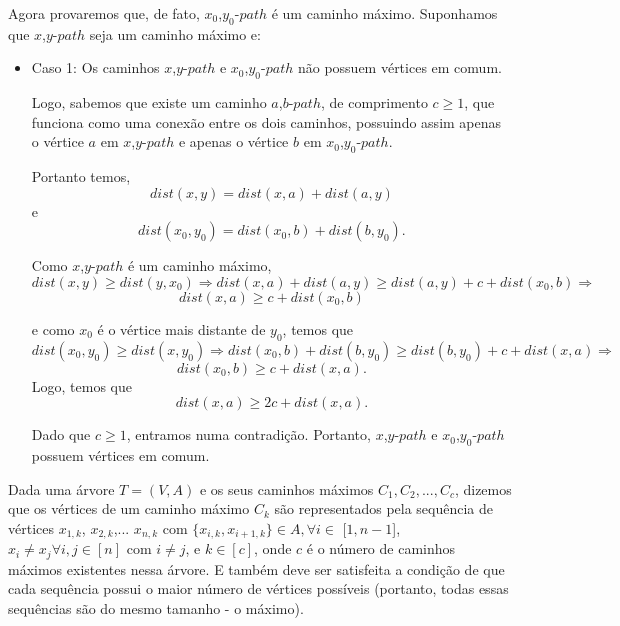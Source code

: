 \documentclass[a4paper,12pt]{article}
\begin{document}
    	Agora provaremos que, de fato, $x_0$,$y_0$-$path$ é um
    	caminho máximo.
    	Suponhamos que $x$,$y$-$path$ seja um caminho máximo e:

    	\begin{itemize}
            \item Caso 1: Os caminhos $x$,$y$-$path$ e 
            $x_0$,$y_0$-$path$ não possuem vértices em comum.
         


            Logo, sabemos que existe um caminho $a$,$b$-$path$, 
            de comprimento $c \ge 1$,
            que funciona como uma conexão entre os dois caminhos,
            possuindo assim apenas o vértice $a$ em 
            $x$,$y$-$path$ e apenas o vértice $b$ em
            $x_0$,$y_0$-$path$.

            Portanto temos,
            $$ dist(x,y) = dist(x,a) + dist(a,y) $$ e
            $$ dist(x_0,y_0) = dist(x_0,b) + dist(b,y_0).$$

            Como $x$,$y$-$path$ é um caminho máximo,
            $$ dist(x,y)\ge dist(y,x_0) \Rightarrow 
            dist(x,a)+dist(a,y)\ge dist(a,y)+c+dist(x_0,b)
            \Rightarrow$$
            $$ dist(x,a)\ge c+dist(x_0,b) $$

            e como $x_0$ é o vértice mais distante de $y_0$, temos
            que 
            $$ dist(x_0,y_0)\ge dist(x,y_0) \Rightarrow 
            dist(x_0,b) + dist(b,y_0)\ge dist(b,y_0) + c + 
            dist(x,a) \Rightarrow $$
            $$ dist(x_0,b)\ge c + dist(x,a). $$ 
            Logo, temos que
            $$ dist(x,a)\ge 2c + dist(x, a). $$

            Dado que $c\ge 1$, entramos numa contradição. 
            Portanto, $x$,$y$-$path$ e $x_0$,$y_0$-$path$
            possuem vértices em comum.

        \end{itemize}




    	\newpage



        Dada uma árvore $T = (V,A)$ e os seus caminhos máximos 
        $C_1, C_2,..., C_c$, dizemos que os vértices de um caminho
        máximo $C_k$ são representados pela sequência de vértices 
        $x_{1, k}$, $x_{2, k}$,... $x_{n, k}$ com 
        $\{x_{i, k}, x_{i+1, k}\} \in A, \forall i \in$ [$1, n-1$],
        $x_i\neq x_j \forall i, j \in [n]$ 
        com $i \neq j$, 
        e $k \in [c]$, 
        onde $c$ é o número de caminhos máximos existentes nessa
        árvore.
        E também deve ser satisfeita a condição de que cada 
        sequência possui o maior número de vértices possíveis 
        (portanto, todas essas sequências são do mesmo tamanho - 
        o máximo).
\end{document}
